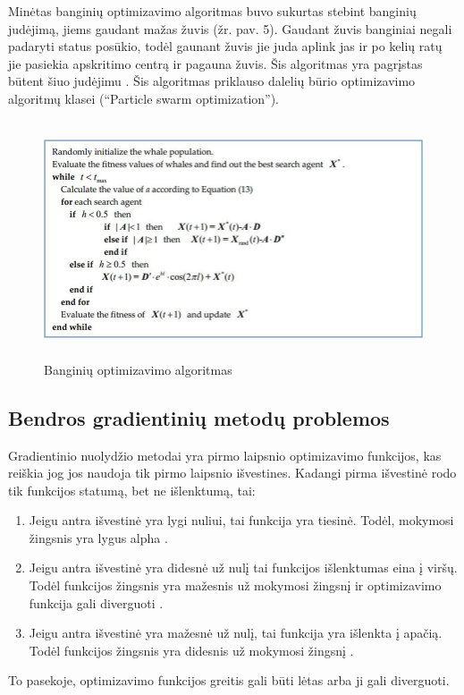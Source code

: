 \documentclass{VUMIFInfKursinis}
\begin{document}
\par
Minėtas banginių optimizavimo algoritmas buvo sukurtas stebint banginių judėjimą, jiems gaudant mažas žuvis (žr. pav. 5). Gaudant žuvis banginiai negali
padaryti status posūkio, todėl gaunant žuvis jie juda aplink jas ir po kelių ratų jie pasiekia apskritimo
centrą ir pagauna žuvis. Šis algoritmas yra pagrįstas būtent šiuo judėjimu \cite{salt10}. Šis algoritmas priklauso dalelių būrio optimizavimo algoritmų klasei (\enquote{Particle swarm optimization}).
\begin{figure}[ht]
  \centering
  \includegraphics[width=12cm,height=7cm,keepaspectratio]{what_alg.png}
  \caption{Banginių optimizavimo algoritmas \cite{salt10}}
  \label{fig:lygtis1}
\end{figure}

\subsection{Bendros gradientinių metodų problemos}
\par
Gradientinio nuolydžio metodai yra pirmo laipsnio optimizavimo funkcijos, kas
reiškia jog jos naudoja tik pirmo laipsnio išvestines. Kadangi pirma išvestinė rodo
tik funkcijos statumą, bet ne išlenktumą, tai:
\begin{enumerate}
\item Jeigu antra išvestinė yra lygi nuliui, tai funkcija yra tiesinė. Todėl,
mokymosi žingsnis yra lygus alpha \cite{salt9}.
\item Jeigu antra išvestinė yra didesnė už nulį tai funkcijos išlenktumas eina į viršų.
Todėl funkcijos žingsnis yra mažesnis už mokymosi žingsnį ir optimizavimo funkcija gali
diverguoti \cite{salt9}.
\item Jeigu antra išvestinė yra mažesnė už nulį, tai funkcija yra išlenkta į apačią.
Todėl funkcijos žingsnis yra didesnis už mokymosi žingsnį \cite{salt9}.
\end{enumerate}
\par
To pasekoje, optimizavimo funkcijos greitis gali būti lėtas arba ji gali diverguoti.
\end{document}
